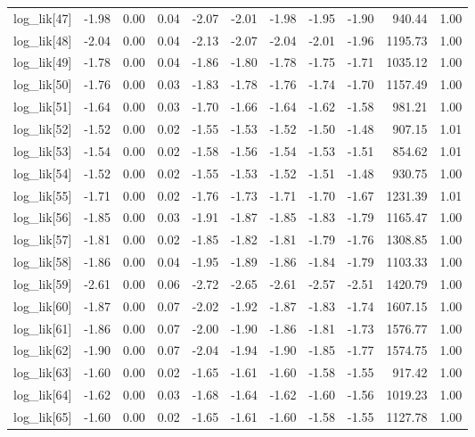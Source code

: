 \begin{table}[ht]
\begin{tabular}{rrrrrrrrrrr}
  log\_lik[47] & -1.98 & 0.00 & 0.04 & -2.07 & -2.01 & -1.98 & -1.95 & -1.90 & 940.44 & 1.00 \\ 
  log\_lik[48] & -2.04 & 0.00 & 0.04 & -2.13 & -2.07 & -2.04 & -2.01 & -1.96 & 1195.73 & 1.00 \\ 
  log\_lik[49] & -1.78 & 0.00 & 0.04 & -1.86 & -1.80 & -1.78 & -1.75 & -1.71 & 1035.12 & 1.00 \\ 
  log\_lik[50] & -1.76 & 0.00 & 0.03 & -1.83 & -1.78 & -1.76 & -1.74 & -1.70 & 1157.49 & 1.00 \\ 
  log\_lik[51] & -1.64 & 0.00 & 0.03 & -1.70 & -1.66 & -1.64 & -1.62 & -1.58 & 981.21 & 1.00 \\ 
  log\_lik[52] & -1.52 & 0.00 & 0.02 & -1.55 & -1.53 & -1.52 & -1.50 & -1.48 & 907.15 & 1.01 \\ 
  log\_lik[53] & -1.54 & 0.00 & 0.02 & -1.58 & -1.56 & -1.54 & -1.53 & -1.51 & 854.62 & 1.01 \\ 
  log\_lik[54] & -1.52 & 0.00 & 0.02 & -1.55 & -1.53 & -1.52 & -1.51 & -1.48 & 930.75 & 1.00 \\ 
  log\_lik[55] & -1.71 & 0.00 & 0.02 & -1.76 & -1.73 & -1.71 & -1.70 & -1.67 & 1231.39 & 1.01 \\ 
  log\_lik[56] & -1.85 & 0.00 & 0.03 & -1.91 & -1.87 & -1.85 & -1.83 & -1.79 & 1165.47 & 1.00 \\ 
  log\_lik[57] & -1.81 & 0.00 & 0.02 & -1.85 & -1.82 & -1.81 & -1.79 & -1.76 & 1308.85 & 1.00 \\ 
  log\_lik[58] & -1.86 & 0.00 & 0.04 & -1.95 & -1.89 & -1.86 & -1.84 & -1.79 & 1103.33 & 1.00 \\ 
  log\_lik[59] & -2.61 & 0.00 & 0.06 & -2.72 & -2.65 & -2.61 & -2.57 & -2.51 & 1420.79 & 1.00 \\ 
  log\_lik[60] & -1.87 & 0.00 & 0.07 & -2.02 & -1.92 & -1.87 & -1.83 & -1.74 & 1607.15 & 1.00 \\ 
  log\_lik[61] & -1.86 & 0.00 & 0.07 & -2.00 & -1.90 & -1.86 & -1.81 & -1.73 & 1576.77 & 1.00 \\ 
  log\_lik[62] & -1.90 & 0.00 & 0.07 & -2.04 & -1.94 & -1.90 & -1.85 & -1.77 & 1574.75 & 1.00 \\ 
  log\_lik[63] & -1.60 & 0.00 & 0.02 & -1.65 & -1.61 & -1.60 & -1.58 & -1.55 & 917.42 & 1.00 \\ 
  log\_lik[64] & -1.62 & 0.00 & 0.03 & -1.68 & -1.64 & -1.62 & -1.60 & -1.56 & 1019.23 & 1.00 \\ 
  log\_lik[65] & -1.60 & 0.00 & 0.02 & -1.65 & -1.61 & -1.60 & -1.58 & -1.55 & 1127.78 & 1.00 \\ 

\end{tabular}
\end{table}
